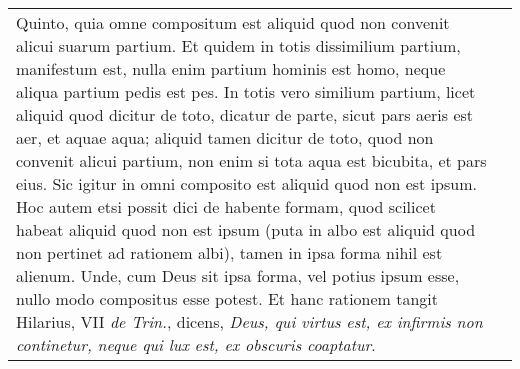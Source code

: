 \documentclass[10pt]{jsarticle}
\begin{document}
\begin{longtable}{p{21em}p{21em}}
\\

Quinto, quia omne compositum est aliquid quod non convenit alicui
suarum partium. Et quidem in totis dissimilium partium, manifestum
est, nulla enim partium hominis est homo, neque aliqua partium pedis
est pes. In totis vero similium partium, licet aliquid quod dicitur de
toto, dicatur de parte, sicut pars aeris est aer, et aquae aqua;
aliquid tamen dicitur de toto, quod non convenit alicui partium, non
enim si tota aqua est bicubita, et pars eius. Sic igitur in omni
composito est aliquid quod non est ipsum. Hoc autem etsi possit dici
de habente formam, quod scilicet habeat aliquid quod non est ipsum
(puta in albo est aliquid quod non pertinet ad rationem albi), tamen
in ipsa forma nihil est alienum. Unde, cum Deus sit ipsa forma, vel
potius ipsum esse, nullo modo compositus esse potest. Et hanc rationem
tangit Hilarius, VII {\itshape de Trin.}, dicens, {\itshape Deus, qui
virtus est, ex infirmis non continetur, neque qui lux est, ex obscuris
coaptatur}.

&


\end{longtable}
\end{document}
